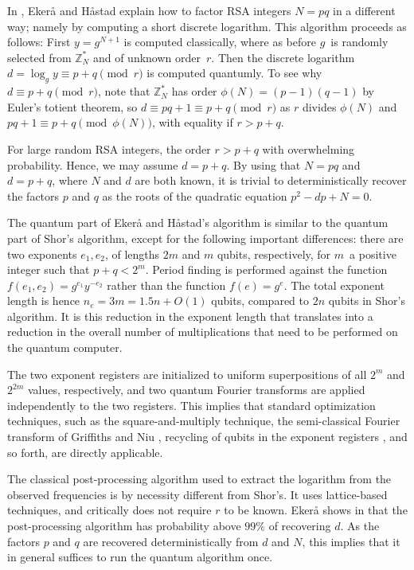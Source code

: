 \documentclass[superscriptaddress,notitlepage,longbibliography]{revtex4-1}
\theoremstyle{definition}
\theoremstyle{definition}
\newcommand{\gen}{g}
\begin{document}
In \cite{ekeraa2016modifying,ekeraa2017quantum,ekeraa2017pp}, Ekerå and Håstad explain how to factor RSA integers $N = pq$ in a different way; namely by computing a short discrete logarithm.
This algorithm proceeds as follows:
First $y = \gen^{N+1}$ is computed classically, where as before $\gen$ is randomly selected from $\mathbb Z_N^*$ and of unknown order~$r$.
Then the discrete logarithm $d = \log_{\gen} y \equiv p + q \pmod{r}$ is computed quantumly.
To see why $d \equiv p + q \pmod{r}$, note that $\mathbb Z_N^*$ has order $\phi(N) = (p-1)(q-1)$ by Euler's totient theorem, so $d \equiv pq + 1 \equiv p + q \pmod{r}$ as $r$ divides $\phi(N)$ and $pq + 1 \equiv p + q \pmod{\phi(N)}$, with equality if $r > p + q$.

For large random RSA integers, the order $r > p + q$ with overwhelming probability.
Hence, we may assume $d = p + q$.
By using that $N = pq$ and $d=p+q$, where $N$ and $d$ are both known, it is trivial to deterministically recover the factors $p$ and $q$ as the roots of the quadratic equation $p^2 - dp + N = 0$.

The quantum part of Ekerå and Håstad's algorithm is similar to the quantum part of Shor's algorithm, except for the following important differences:
there are two exponents $e_1, e_2$, of lengths $2m$ and $m$ qubits, respectively, for $m$ a positive integer such that $p + q < 2^m$.
Period finding is performed against the function $f(e_1, e_2) = \gen^{e_1} y^{-e_2}$ rather than the function $f(e)=\gen^e$.
The total exponent length is hence $n_e = 3m = 1.5n + O(1)$ qubits, compared to $2n$ qubits in Shor's algorithm.
It is this reduction in the exponent length that translates into a reduction in the overall number of multiplications that need to be performed on the quantum computer.

The two exponent registers are initialized to uniform superpositions of all $2^m$ and $2^{2m}$ values, respectively, and two quantum Fourier transforms are applied independently to the two registers.
This implies that standard optimization techniques, such as the square-and-multiply technique, the semi-classical Fourier transform of Griffiths and Niu \cite{griffiths1996semiclassical}, recycling of qubits in the exponent registers \cite{mosca1999recycle}, and so forth, are directly applicable.

The classical post-processing algorithm used to extract the logarithm from the observed frequencies is by necessity different from Shor's.
It uses lattice-based techniques, and critically does not require $r$ to be known.
Ekerå shows in \cite{ekeraa2017pp} that the post-processing algorithm has probability above $99\%$ of recovering $d$.
As the factors $p$ and $q$ are recovered deterministically from $d$ and $N$, this implies that it in general suffices to run the quantum algorithm once.
\end{document}
